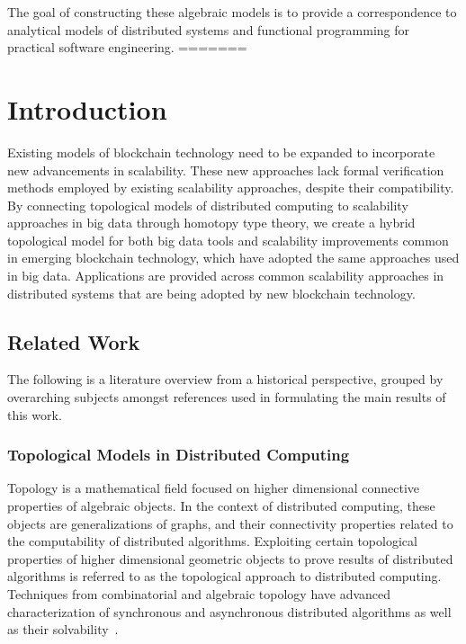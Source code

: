 \documentclass[runningheads]{llncs}
\begin{document}
The goal of constructing these algebraic models is to provide a correspondence to analytical models of distributed systems and functional programming for practical software engineering. 
=======
\section{Introduction} 
Existing models of blockchain technology need to be expanded to incorporate new advancements in scalability. These new approaches lack formal verification methods employed by existing scalability approaches, despite their compatibility. By connecting topological models of distributed computing to scalability approaches in big data through homotopy type theory, we create a hybrid topological model for both big data tools and scalability improvements common in emerging blockchain technology, which have adopted the same approaches used in big data. Applications are provided across common scalability approaches in distributed systems that are being adopted by new blockchain technology.

\subsection{Related Work}
The following is a literature overview from a historical perspective, grouped by overarching subjects amongst references used in formulating the main results of this work. 

\subsubsection{Topological Models in Distributed Computing}
Topology is a mathematical field focused on higher dimensional connective properties of algebraic objects. In the context of distributed computing, these objects are generalizations of graphs, and their connectivity properties related to the computability of distributed algorithms. Exploiting certain topological properties of higher dimensional geometric objects to prove results of distributed algorithms is referred to as the topological approach to distributed computing. Techniques from combinatorial and algebraic topology have advanced characterization of synchronous and asynchronous distributed algorithms as well as their solvability~\cite{ref_article1,ref_article2,ref_article3,ref_article4}. 
\end{document}
